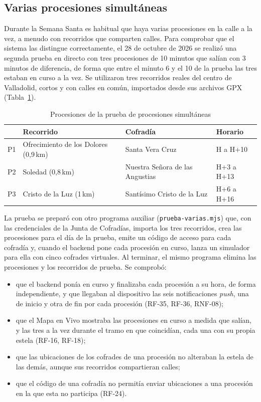 \subsection{Varias procesiones simultáneas}

Durante la Semana Santa es habitual que haya varias procesiones en la calle a la vez, a menudo con recorridos que comparten calles. Para comprobar que el sistema las distingue correctamente, el 28 de octubre de 2026 se realizó una segunda prueba en directo con tres procesiones de 10 minutos que salían con 3 minutos de diferencia, de forma que entre el minuto 6 y el 10 de la prueba las tres estaban en curso a la vez. Se utilizaron tres recorridos reales del centro de Valladolid, cortos y con calles en común, importados desde sus archivos GPX (Tabla~\ref{tab:pruebaSimultanea}).

\begin{table}[H]
\centering
\small
\renewcommand{\arraystretch}{1.2}
\begin{tabular}{|p{1.2cm}|p{4.6cm}|p{4.6cm}|p{2.6cm}|}
\hline
 & \textbf{Recorrido} & \textbf{Cofradía} & \textbf{Horario} \\
\hline
P1 & Ofrecimiento de los Dolores (0,9\,km) & Santa Vera Cruz & H a H+10 \\
\hline
P2 & Soledad (0,8\,km) & Nuestra Señora de las Angustias & H+3 a H+13 \\
\hline
P3 & Cristo de la Luz (1\,km) & Santísimo Cristo de la Luz & H+6 a H+16 \\
\hline
\end{tabular}
\caption{Procesiones de la prueba de procesiones simultáneas}
\label{tab:pruebaSimultanea}
\end{table}

La prueba se preparó con otro programa auxiliar (\texttt{prueba-varias.mjs}) que, con las credenciales de la Junta de Cofradías, importa los tres recorridos, crea las procesiones para el día de la prueba, emite un código de acceso para cada cofradía y, cuando el backend pone cada procesión en curso, lanza un simulador para ella con cinco cofrades virtuales. Al terminar, el mismo programa elimina las procesiones y los recorridos de prueba. Se comprobó:

\begin{itemize}
    \item que el backend ponía en curso y finalizaba cada procesión a su hora, de forma independiente, y que llegaban al dispositivo las seis notificaciones \emph{push}, una de inicio y otra de fin por cada procesión (RF-35, RF-36, RNF-08);
    \item que el Mapa en Vivo mostraba las procesiones en curso a medida que salían, y las tres a la vez durante el tramo en que coincidían, cada una con su propia estela (RF-16, RF-18);
    \item que las ubicaciones de los cofrades de una procesión no alteraban la estela de las demás, aunque sus recorridos compartieran calles;
    \item que el código de una cofradía no permitía enviar ubicaciones a una procesión en la que esta no participa (RF-24).
\end{itemize}

